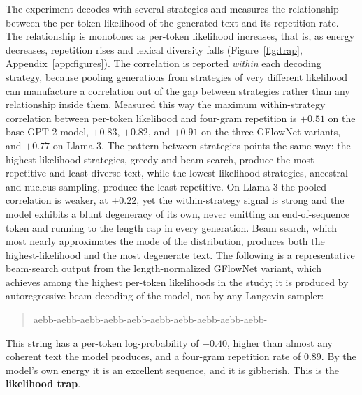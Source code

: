 The experiment decodes with several strategies and measures the relationship between the per-token likelihood of the generated text and its repetition rate. The relationship is monotone: as per-token likelihood increases, that is, as energy decreases, repetition rises and lexical diversity falls (Figure~\ref{fig:trap}, Appendix~\ref{app:figures}). The correlation is reported \emph{within} each decoding strategy, because pooling generations from strategies of very different likelihood can manufacture a correlation out of the gap between strategies rather than any relationship inside them. Measured this way the maximum within-strategy correlation between per-token likelihood and four-gram repetition is $+0.51$ on the base GPT-2 model, $+0.83$, $+0.82$, and $+0.91$ on the three GFlowNet variants, and $+0.77$ on Llama-3.
The pattern between strategies points the same way: the highest-likelihood strategies, greedy and beam search, produce the most repetitive and least diverse text, while the lowest-likelihood strategies, ancestral and nucleus sampling, produce the least repetitive. On Llama-3 the pooled correlation is weaker, at $+0.22$, yet the within-strategy signal is strong and the model exhibits a blunt degeneracy of its own, never emitting an end-of-sequence token and running to the length cap in every generation.
Beam search, which most nearly approximates the mode of the distribution, produces both the highest-likelihood and the most degenerate text. The following is a representative beam-search output from the length-normalized GFlowNet variant, which achieves among the highest per-token likelihoods in the study; it is produced by autoregressive beam decoding of the model, not by any Langevin sampler:

\begin{quote}
\ttfamily aebb-aebb-aebb-aebb-aebb-aebb-aebb-aebb-aebb-aebb-
\end{quote}

This string has a per-token log-probability of $-0.40$, higher than almost any coherent text the model produces, and a four-gram repetition rate of $0.89$.
By the model's own energy it is an excellent sequence, and it is gibberish. This is the \textbf{likelihood trap}.

